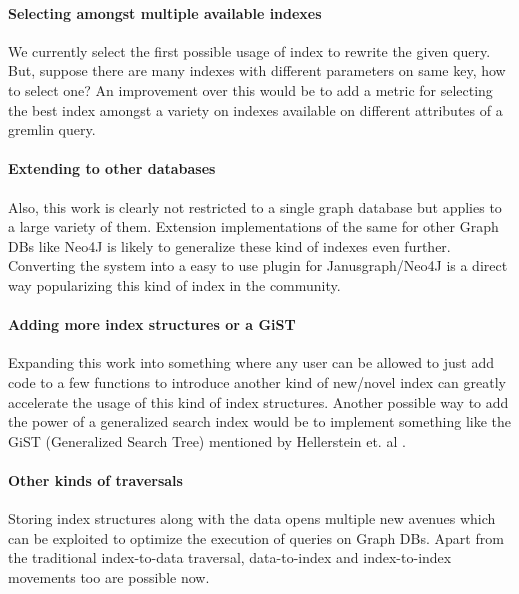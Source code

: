 \paragraph{Selecting amongst multiple available indexes}
$\:$\\
We currently select the first possible usage of index to rewrite the given query. But, suppose there are many indexes with different parameters on same key, how to select one? An improvement over this would be to add a metric for selecting the best index amongst a variety on indexes available on different attributes of a gremlin query. 

\paragraph{Extending to other databases}
$\:$\\
Also, this work is clearly not restricted to a single graph database but applies to a large variety of them. Extension implementations of the same for other Graph DBs like Neo4J is likely to generalize these kind of indexes even further. Converting the system into a easy to use plugin for Janusgraph/Neo4J is a direct way popularizing this kind of index in the community.

\paragraph{Adding more index structures or a GiST}
$\:$\\
Expanding this work into something where any user can be allowed to just add code to a few functions to introduce another kind of new/novel index can greatly accelerate the usage of this kind of index structures. Another possible way to add the power of a generalized search index would be to implement something like the GiST (Generalized Search Tree) mentioned by Hellerstein et. al \cite{GiST}.

\paragraph{Other kinds of traversals}
$\:$\\
Storing index structures along with the data opens multiple new avenues which can be exploited to optimize the execution of queries on Graph DBs. Apart from the traditional index-to-data traversal, data-to-index and index-to-index movements too are possible now.


